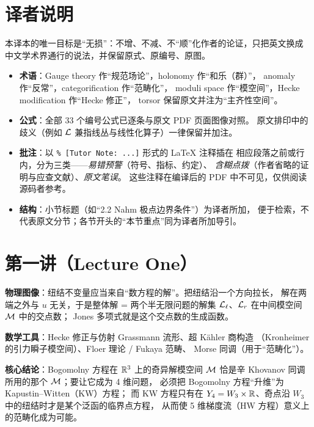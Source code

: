\section*{译者说明}

本译本的唯一目标是“无损”：不增、不减、不“顺”化作者的论证，只把英文换成
中文学术界通行的说法，并保留原式、原编号、原图。

\begin{itemize}[leftmargin=1.4em,itemsep=2pt]
  \item \textbf{术语}：Gauge theory 作“规范场论”，holonomy 作“和乐（群）”，
        anomaly 作“反常”，categorification 作“范畴化”，
        moduli space 作“模空间”，Hecke modification 作“Hecke 修正”，
        torsor 保留原文并注为“主齐性空间”。
  \item \textbf{公式}：全部 33 个编号公式已逐条与原文 PDF 页面图像对照。
        原文排印中的歧义（例如 $\mathcal{L}$ 兼指线丛与线性化算子）一律保留并加注。
  \item \textbf{批注}：以 \verb|% [Tutor Note: ...]| 形式的 LaTeX 注释插在
        相应段落之前或行内，分为三类——\emph{易错预警}（符号、指标、约定）、
        \emph{含糊点拨}（作者省略的证明与应查文献）、\emph{原文笔误}。
        这些注释在编译后的 PDF 中不可见，仅供阅读源码者参考。
  \item \textbf{结构}：小节标题（如“2.2 Nahm 极点边界条件”）为译者所加，
        便于检索，不代表原文分节；各节开头的“本节重点”同为译者所加导引。
\end{itemize}

\tableofcontents
\newpage

\section{第一讲（Lecture One）}
\label{sec:lecture-one}

\begin{keypoints}
  \item \textbf{物理图像}：纽结不变量应当来自“数方程的解”。把纽结沿一个方向拉长，
        解在两端之外与 $u$ 无关，于是整体解 = 两个半无限问题的解集
        $\mathcal{L}_\ell$、$\mathcal{L}_r$ 在中间模空间 $\mathcal{M}$ 中的交点数；
        Jones 多项式就是这个交点数的生成函数。
  \item \textbf{数学工具}：Hecke 修正与仿射 Grassmann 流形、超 Kähler 商构造
        （Kronheimer 的引力瞬子模空间）、Floer 理论 / Fukaya 范畴、
        Morse 同调（用于“范畴化”）。
  \item \textbf{核心结论}：Bogomolny 方程在 $\mathbb{R}^3$ 上的奇异解模空间 $\mathcal{M}$
        恰是辛 Khovanov 同调所用的那个 $\mathcal{M}$；要让它成为 4 维问题，
        必须把 Bogomolny 方程“升维”为 Kapustin--Witten（KW）方程；
        而 KW 方程只有在 $Y_4=W_3\times\mathbb{R}$、奇点沿 $W_3$ 中的纽结时才是某个泛函的临界点方程，
        从而使 5 维梯度流（HW 方程）意义上的范畴化成为可能。
\end{keypoints}

